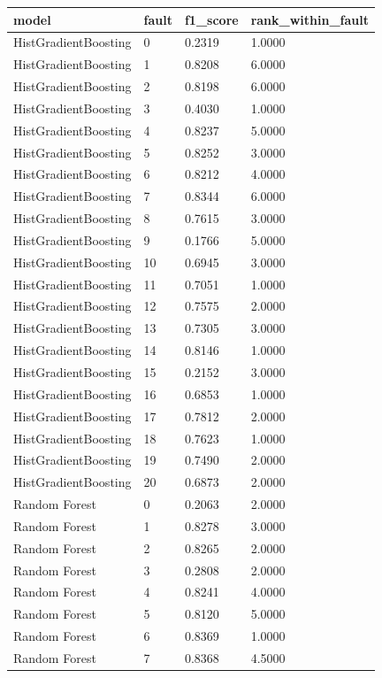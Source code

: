 \begin{tabular}{llll}
\toprule
model & fault & f1\_score & rank\_within\_fault \\
\midrule
HistGradientBoosting & 0 & 0.2319 & 1.0000 \\
HistGradientBoosting & 1 & 0.8208 & 6.0000 \\
HistGradientBoosting & 2 & 0.8198 & 6.0000 \\
HistGradientBoosting & 3 & 0.4030 & 1.0000 \\
HistGradientBoosting & 4 & 0.8237 & 5.0000 \\
HistGradientBoosting & 5 & 0.8252 & 3.0000 \\
HistGradientBoosting & 6 & 0.8212 & 4.0000 \\
HistGradientBoosting & 7 & 0.8344 & 6.0000 \\
HistGradientBoosting & 8 & 0.7615 & 3.0000 \\
HistGradientBoosting & 9 & 0.1766 & 5.0000 \\
HistGradientBoosting & 10 & 0.6945 & 3.0000 \\
HistGradientBoosting & 11 & 0.7051 & 1.0000 \\
HistGradientBoosting & 12 & 0.7575 & 2.0000 \\
HistGradientBoosting & 13 & 0.7305 & 3.0000 \\
HistGradientBoosting & 14 & 0.8146 & 1.0000 \\
HistGradientBoosting & 15 & 0.2152 & 3.0000 \\
HistGradientBoosting & 16 & 0.6853 & 1.0000 \\
HistGradientBoosting & 17 & 0.7812 & 2.0000 \\
HistGradientBoosting & 18 & 0.7623 & 1.0000 \\
HistGradientBoosting & 19 & 0.7490 & 2.0000 \\
HistGradientBoosting & 20 & 0.6873 & 2.0000 \\
Random Forest & 0 & 0.2063 & 2.0000 \\
Random Forest & 1 & 0.8278 & 3.0000 \\
Random Forest & 2 & 0.8265 & 2.0000 \\
Random Forest & 3 & 0.2808 & 2.0000 \\
Random Forest & 4 & 0.8241 & 4.0000 \\
Random Forest & 5 & 0.8120 & 5.0000 \\
Random Forest & 6 & 0.8369 & 1.0000 \\
Random Forest & 7 & 0.8368 & 4.5000 \\

\end{tabular}
